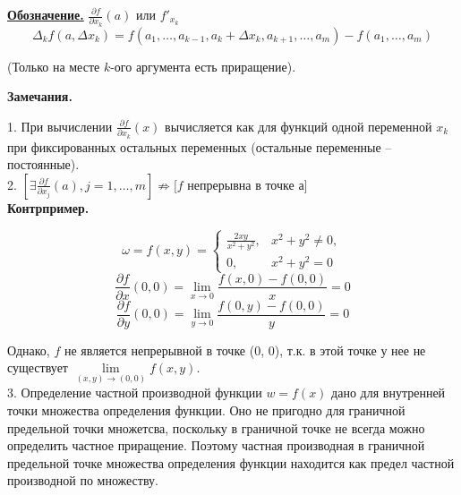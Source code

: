 \documentclass[a4paper,12pt]{article} %
\begin{document}
	\underline{\textbf{Обозначение.}}  $\frac{\partial f}{\partial x_k}(a)$ или $f'_{x_k}$
	\[\Delta_k f(a, \Delta{x_k}) = f(a_1, \ldots, a_{k-1}, a_k + \Delta x_k, a_{k+1}, \ldots, a_m) - f(a_1, \ldots, a_m)\] 
	\begin{center}
		(Только на месте $k$-ого аргумента есть приращение).\\
	\end{center}
	
	\textbf{Замечания.}
	
	1. При вычислении  $\frac{\partial f}{\partial x_k}(x)$ вычисляется как для функций одной переменной $x_k$ при фиксированных остальных переменных (остальные переменные -- постоянные).\\
	
	2. $\left[\exists \frac{\partial f}{\partial x_j}(a), j = 1, \ldots, m\right] \not\Rightarrow [f$ непрерывна в точке а$]$ \\
	
	\textbf{Контрпример.}
	
	\begin{equation*}
		\omega = f(x, y) = 
		\begin{cases}
			\frac{2xy}{x^2 + y^2}, & x^2 + y^2 \not=0,\\
			0, & x^2 + y^2 = 0
		\end{cases}
	\end{equation*}
	\[\frac{\partial f}{\partial x}(0,0) = \lim\limits_{x\to 0} \frac{f(x, 0) - f(0, 0)}{x} = 0\]
	\[\frac{\partial f}{\partial y}(0,0) = \lim\limits_{y\to 0} \frac{f(0, y) - f(0, 0)}{y} = 0\]
	
	Однако, $f$ не является непрерывной в точке (0, 0), т.к. в этой точке у нее не существует $\lim\limits_{(x, y) \to (0, 0)} f(x, y)$.\\
	
	3. Определение частной производной функции $w = f(x)$ дано для внутренней точки множества определения функции. Оно не пригодно для граничной предельной точки множетсва, поскольку в граничной точке не всегда можно определить частное приращение. Поэтому частная производная в граничной предельной точке множества определения функции находится как предел частной производной по множеству.
	
\end{document}
